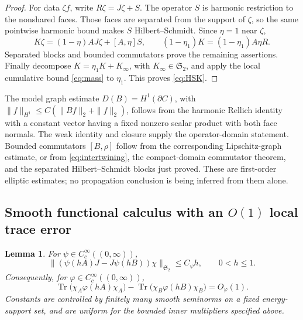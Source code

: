 \documentclass[11pt]{amsart}
\numberwithin{equation}{section}
\newtheorem{lemma}[theorem]{Lemma}
\theoremstyle{remark}
\newcommand{\Tr}{\operatorname{Tr}}
\newcommand{\Stwo}{\mathfrak{S}_2}
\begin{document}
\begin{proof}
For data $\zeta f$, write $R\zeta=J\zeta+S$. The operator $S$ is harmonic restriction to the nonshared faces. Those faces are separated from the support of $\zeta$, so the same pointwise harmonic bound makes $S$ Hilbert--Schmidt. Since $\eta=1$ near $\zeta$,
\begin{equation}\label{eq:Kzeta}
K\zeta=(1-\eta)AJ\zeta+[A,\eta]S,\qquad (1-\eta_1)K=(1-\eta_1)A\eta R .
\end{equation}
Separated blocks and bounded commutators prove the remaining assertions. Finally decompose $K=\eta_1K+K_\infty$, with $K_\infty\in\Stwo$, and apply the local cumulative bound \eqref{eq:mass} to $\eta_1$. This proves \eqref{eq:HSK}.
\end{proof}

The model graph estimate $D(B)=H^1(\partial C)$, with $\|f\|_{H^1}\le C(\|Bf\|_2+\|f\|_2)$, follows from the harmonic Rellich identity with a constant vector having a fixed nonzero scalar product with both face normals. The weak identity and closure supply the operator-domain statement. Bounded commutators $[B,\rho]$ follow from the corresponding Lipschitz-graph estimate, or from \eqref{eq:intertwining}, the compact-domain commutator theorem, and the separated Hilbert--Schmidt blocks just proved. These are first-order elliptic estimates; no propagation conclusion is being inferred from them alone.

\subsection{Smooth functional calculus with an $O(1)$ local trace error}
\begin{lemma}\label{lem:smoothcalc}
For $\psi\in C_c^\infty((0,\infty))$,
\begin{equation}\label{eq:psiHS}
\|(\psi(hA)J-J\psi(hB))\chi\|_{\Stwo}\le C_\psi h,\qquad 0<h\le1 .
\end{equation}
Consequently, for $\varphi\in C_c^\infty((0,\infty))$,
\begin{equation}\label{eq:smoothtrace}
\Tr\big(\chi_A\varphi(hA)\chi_A\big)-\Tr\big(\chi_B\varphi(hB)\chi_B\big)=O_\varphi(1) .
\end{equation}
Constants are controlled by finitely many smooth seminorms on a fixed energy-support set, and are uniform for the bounded inner multipliers specified above.
\end{lemma}
\end{document}
